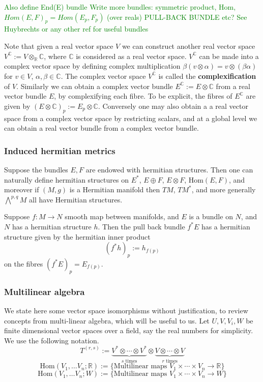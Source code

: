 \documentclass[a4paper]{article}
\theoremstyle{definition} \newtheorem*{definition}{Definition}
\theoremstyle{definition} \newtheorem*{definitions}{Definitions}
\theoremstyle{plain} \newtheorem{theorem}{Theorem}[section]
\theoremstyle{plain} \newtheorem{proposition}[theorem]{Proposition}
\theoremstyle{plain} \newtheorem{corollary}[theorem]{Corollary}
\theoremstyle{plain} \newtheorem{lemma}[theorem]{Lemma}
\theoremstyle{plain} \newtheorem{example}[theorem]{Example}
\newcommand{\finish}[1]{\textcolor{green}{#1}}
\newcommand{\defn}[1]{\textbf{#1}}
\newcommand{\realnos}{\mathbb{R}}
\newcommand{\complexnos}{\mathbb{C}}
\newcommand{\Hom}{\text{Hom}}
\begin{document}
\finish{Also define End(E) bundle}
\finish{Write more bundles: symmetric product, Hom,  $Hom(E,F)_p = Hom(E_p, F_p)$ (over reals)
PULL-BACK BUNDLE etc? See Huybrechts or any other ref for useful bundles}

Note that given a real vector space $V$ we can construct another real vector space $V^\complexnos := V\otimes_\realnos \complexnos$, where $\complexnos$ is considered as a real vector space. $V^\complexnos$ can be made into a complex vector space by defining complex multiplication $\beta(v\otimes \alpha) = v\otimes (\beta \alpha)$ for $v\in V$, $\alpha, \beta \in \complexnos$. The complex vector space $V^\complexnos$ is called the \defn{complexification} of $V$. Similarly we can obtain a complex vector bundle $E^\complexnos := E\otimes \complexnos$ from a real vector bundle $E$, by complexifying each fibre. To be explicit, the fibres of $E^\complexnos$ are given by $(E\otimes \complexnos)_p := E_p\otimes \complexnos$.
Conversely one may also obtain a a real vector space from a complex vector space by restricting scalars, and at a global level we can obtain a real vector bundle from a complex vector bundle. 

\subsubsection{Induced hermitian metrics}
Suppose the bundles $E, F$ are endowed with hermitian structures. Then one can naturally define hermitian structures on $E^*$, $E\oplus F$, $E\otimes F$, $\Hom(E, F)$, and moreover if $(M, g)$ is a Hermitian manifold then $TM$, $TM^*$, and more generally $\bigwedge^{p,q} M$ all have Hermitian structures.

Suppose $f:M\to N$ smooth map between manifolds, and $E$ is a bundle on $N$, and $N$ has a hermitian structure $h$. Then the pull back bundle $f^*E$ has a hermitian structure given by the hermitian inner product
$$(f^*h)_p:=h_{f(p)}$$
on the fibres $(f^*E)_p=E_{f(p)}$.

\subsubsection{Multilinear algebra}
We state here some vector space isomorphisms without justification, to review concepts from multi-linear algebra, which will be useful to us. Let $U, V, V_i, W$ be finite dimensional vector spaces over a field, say the real numbers for simplicity. We use the following notation.
$$T^{(r,s)}:=\underbrace{V^*\otimes \cdots \otimes V^*}_{s \text{ times}} \otimes \underbrace{V \otimes \cdots \otimes V}_{r \text{ times}} $$
$$\Hom(V_1, \ldots V_n; \realnos):= \{\text{Multilinear maps } V_1\times \cdots \times V_n \to \realnos\}$$
$$\Hom(V_1, \ldots V_n; W):= \{\text{Multilinear maps } V_1\times \cdots \times V_n \to W\}$$
\end{document}
